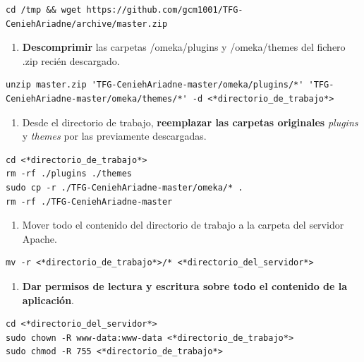 \documentclass[
]{article}
\providecommand{\tightlist}{%
  \setlength{\itemsep}{0pt}\setlength{\parskip}{0pt}}
\begin{document}
\begin{verbatim}
cd /tmp && wget https://github.com/gcm1001/TFG-CeniehAriadne/archive/master.zip
\end{verbatim}

\begin{enumerate}
\def\labelenumi{\arabic{enumi}.}
\setcounter{enumi}{5}
\tightlist
\item
  \textbf{Descomprimir} las carpetas {/omeka/plugins} y {/omeka/themes}
  del fichero {.zip} recién descargado.
\end{enumerate}

\begin{verbatim}
unzip master.zip 'TFG-CeniehAriadne-master/omeka/plugins/*' 'TFG-CeniehAriadne-master/omeka/themes/*' -d <*directorio_de_trabajo*>
\end{verbatim}

\begin{enumerate}
\def\labelenumi{\arabic{enumi}.}
\setcounter{enumi}{6}
\tightlist
\item
  Desde el directorio de trabajo, \textbf{reemplazar las carpetas
  originales} \emph{plugins} y \emph{themes} por las previamente
  descargadas.
\end{enumerate}

\begin{verbatim}
cd <*directorio_de_trabajo*>
rm -rf ./plugins ./themes
sudo cp -r ./TFG-CeniehAriadne-master/omeka/* .
rm -rf ./TFG-CeniehAriadne-master
\end{verbatim}

\begin{enumerate}
\def\labelenumi{\arabic{enumi}.}
\setcounter{enumi}{7}
\tightlist
\item
  Mover todo el contenido del directorio de trabajo a la carpeta del
  servidor Apache.
\end{enumerate}

\begin{verbatim}
mv -r <*directorio_de_trabajo*>/* <*directorio_del_servidor*>
\end{verbatim}

\begin{enumerate}
\def\labelenumi{\arabic{enumi}.}
\setcounter{enumi}{8}
\tightlist
\item
  \textbf{Dar permisos de lectura y escritura sobre todo el contenido de
  la aplicación}.
\end{enumerate}

\begin{verbatim}
cd <*directorio_del_servidor*>
sudo chown -R www-data:www-data <*directorio_de_trabajo*>
sudo chmod -R 755 <*directorio_de_trabajo*>
\end{verbatim}
\end{document}
